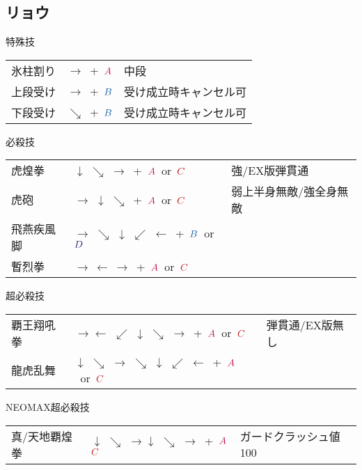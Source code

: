\documentclass[a4j,11pt]{jarticle}
\def\A{$\textcolor{Acolor}{A}$}
\def\C{$\textcolor{Ccolor}{C}$}
\def\B{$\textcolor{Bcolor}{B}$}
\def\D{$\textcolor{Dcolor}{D}$}
\def\hado{$\downarrow$ $\searrow$ $\rightarrow$}%
\def\syoryu{$\rightarrow$ $\downarrow$ $\searrow$}%
\def\yoga{$\leftarrow$ $\swarrow$ $\downarrow$ $\searrow$ $\rightarrow$}%
\def\gyakuyoga{$\rightarrow$ $\searrow$ $\downarrow$ $\swarrow$ $\leftarrow$}%
\def\ryuko{$\downarrow$ $\searrow$ $\rightarrow$ $\searrow$ $\downarrow$ $\swarrow$ $\leftarrow$}%
\begin{document}
\subsection{リョウ}
\begin{itembox}[l]{特殊技}
\begin{tabular}{lll}
氷柱割り&$\rightarrow$\ +\ \A&中段\\%
上段受け&$\rightarrow$\ +\ \B&受け成立時キャンセル可\\%
下段受け&$\searrow$\ +\ \B&受け成立時キャンセル可%
\end{tabular}
\end{itembox}
\begin{itembox}[l]{必殺技}
\begin{tabular}{lll}
虎煌拳&\hado\ +\ \A\ or\ \C&強/EX版弾貫通\\%
虎砲&\syoryu\ +\ \A\ or\ \C&弱上半身無敵/強全身無敵\\%
飛燕疾風脚&\gyakuyoga\ +\ \B\ or\ \D&\\%
暫烈拳&$\rightarrow\ \leftarrow\ \rightarrow$\ +\ \A\ or\ \C&%
\end{tabular}
\end{itembox}
\begin{itembox}[l]{超必殺技}
\begin{tabular}{lll}
覇王翔吼拳&$\rightarrow$\yoga\ +\ \A\ or\ \C&弾貫通/EX版無し\\%
龍虎乱舞&\ryuko\ +\ \A\ or\ \C&%
\end{tabular}
\end{itembox}
\begin{itembox}[l]{NEOMAX超必殺技}
\begin{tabular}{lll}
真/天地覇煌拳&\hado\hado\ +\ \A\C&ガードクラッシュ値100%
\end{tabular}
\end{itembox}
\newpage
\end{document}
